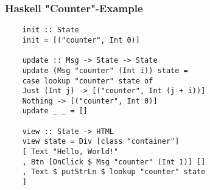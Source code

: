 \begin{frame}
  \frametitle{Haskell "Counter"-Example}
  \begin{verbatim}
    init :: State
    init = [("counter", Int 0)]

    update :: Msg -> State -> State
    update (Msg "counter" (Int i)) state =
    case lookup "counter" state of
    Just (Int j) -> [("counter", Int (j + i))]
    Nothing -> [("counter", Int 0)]
    update _ _ = []

    view :: State -> HTML
    view state = Div [class "container"]
    [ Text "Hello, World!"
    , Btn [OnClick $ Msg "counter" (Int 1)] []
    , Text $ putStrLn $ lookup "counter" state
    ]
  \end{verbatim}
\end{frame}
